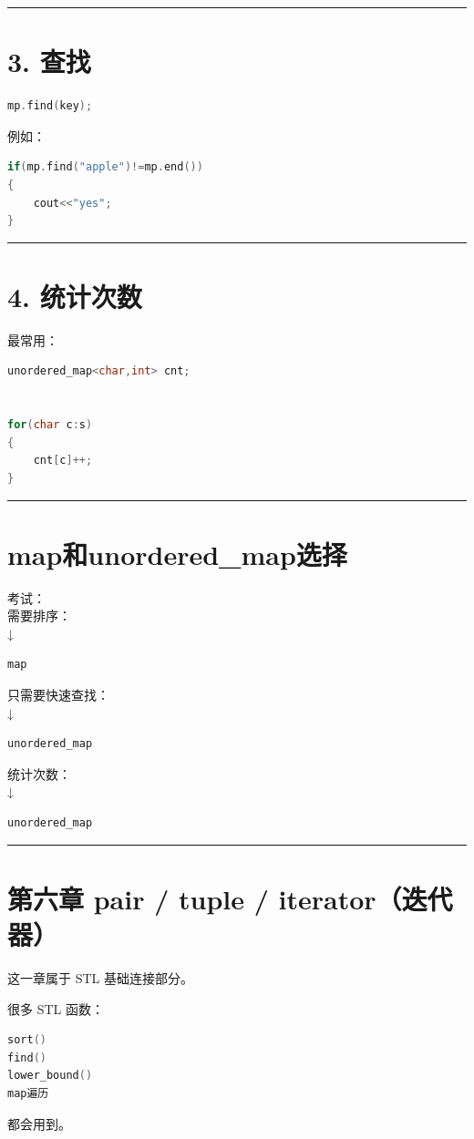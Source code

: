 \documentclass[9pt,twocolumn]{extarticle}
\begin{document}
\noindent\rule{\linewidth}{0.4pt}

\section{3. 查找}
\begin{lstlisting}[language=C++]
mp.find(key);
\end{lstlisting}
例如：
\begin{lstlisting}[language=C++]
if(mp.find("apple")!=mp.end())
{
    cout<<"yes";
}
\end{lstlisting}

\noindent\rule{\linewidth}{0.4pt}

\section{4. 统计次数}
最常用：
\begin{lstlisting}[language=C++]
unordered_map<char,int> cnt;


for(char c:s)
{
    cnt[c]++;
}
\end{lstlisting}

\noindent\rule{\linewidth}{0.4pt}

\section{map和unordered\_map选择}

考试：\\
需要排序：\\
↓
\begin{lstlisting}[language=C++]
map
\end{lstlisting}
只需要快速查找：\\
↓
\begin{lstlisting}[language=C++]
unordered_map
\end{lstlisting}
统计次数：\\
↓
\begin{lstlisting}[language=C++]
unordered_map
\end{lstlisting}

\noindent\rule{\linewidth}{0.4pt}

\section{第六章 pair / tuple / iterator（迭代器）}

这一章属于 STL 基础连接部分。

很多 STL 函数：
\begin{lstlisting}[language=C++]
sort()
find()
lower_bound()
map遍历
\end{lstlisting}
都会用到。
\end{document}
